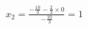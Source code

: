 \documentclass[preview]{standalone}
\begin{document}
\begin{align*}
x_2 = \frac{-\frac{10}{3} - \frac{2}{3} \times 0}{-\frac{10}{3}} = 1
\end{align*}
\end{document}
